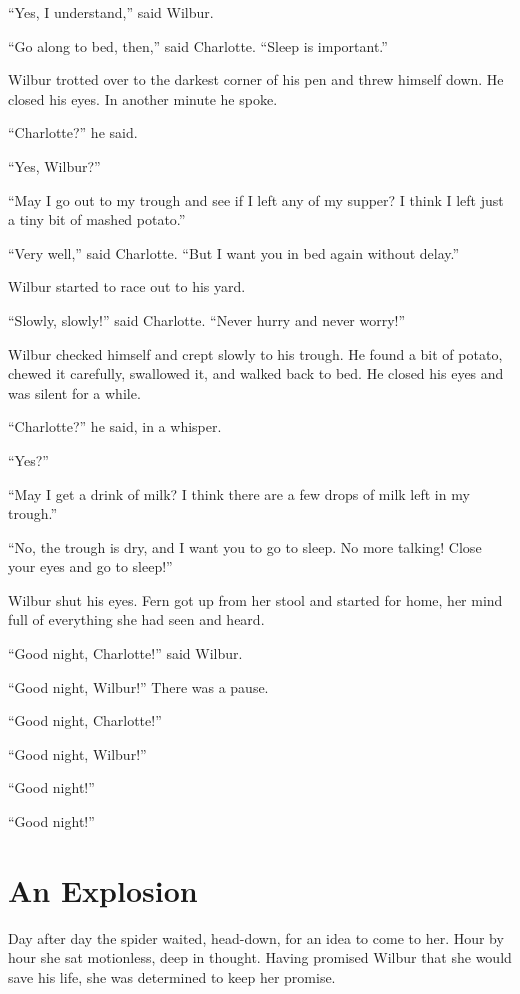 \documentclass[a4paper, oneside]{book}
\begin{document}
``Yes, I understand,'' said Wilbur.

``Go along to bed, then,'' said Charlotte. ``Sleep is important.''

Wilbur trotted over to the darkest corner of his pen and threw
himself down. He closed his eyes. In another minute he spoke. 

``Charlotte?'' he said.

``Yes, Wilbur?''

``May I go out to my trough and see if I left any of my supper? I
think I left just a tiny bit of mashed potato.''

``Very well,'' said Charlotte. ``But I want you in bed again
without delay.''

Wilbur started to race out to his yard.

``Slowly, slowly!'' said Charlotte. ``Never hurry and never
worry!''

 Wilbur checked himself and crept slowly to his trough. He
found a bit of potato, chewed it carefully, swallowed it, and walked
back to bed. He closed his eyes and was silent for a while.

 ``Charlotte?'' he said, in a whisper. 

 ``Yes?''

 ``May I get a drink of milk? I think there are a few drops of
milk left in my trough.''

 ``No, the trough is dry, and I want you to go to sleep. No more
talking! Close your eyes and go to sleep!''

 Wilbur shut his eyes. Fern got up from her stool and started
for home, her mind full of everything she had seen and heard.

 ``Good night, Charlotte!'' said Wilbur.

 ``Good night, Wilbur!''
 There was a pause.

 ``Good night, Charlotte!''

 ``Good night, Wilbur!''

 ``Good night!''

 ``Good night!''
 
 \chapter{An Explosion}
 Day after day the spider waited, head-down, for an idea to come
to her. Hour by hour she sat motionless, deep in thought. Having
promised Wilbur that she would save his life, she was determined 
to keep her promise. 
\end{document}
